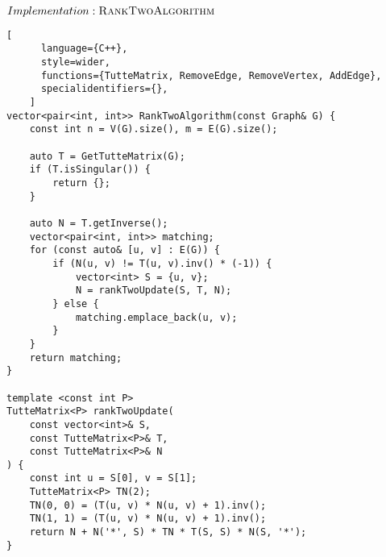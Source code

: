 \begin{programruledcaption}{\(Implementation: \textsc{RankTwoAlgorithm}\)}
    \begin{lstlisting}[
      language={C++},
      style=wider,
      functions={TutteMatrix, RemoveEdge, RemoveVertex, AddEdge},
      specialidentifiers={},
    ]
vector<pair<int, int>> RankTwoAlgorithm(const Graph& G) {
    const int n = V(G).size(), m = E(G).size();

    auto T = GetTutteMatrix(G);
    if (T.isSingular()) {
        return {};
    } 

    auto N = T.getInverse();
    vector<pair<int, int>> matching;
    for (const auto& [u, v] : E(G)) {
        if (N(u, v) != T(u, v).inv() * (-1)) {
            vector<int> S = {u, v};
            N = rankTwoUpdate(S, T, N);
        } else {
            matching.emplace_back(u, v);
        }
    }
    return matching;
}

template <const int P>
TutteMatrix<P> rankTwoUpdate(
    const vector<int>& S, 
    const TutteMatrix<P>& T,
    const TutteMatrix<P>& N
) {
    const int u = S[0], v = S[1];
    TutteMatrix<P> TN(2);
    TN(0, 0) = (T(u, v) * N(u, v) + 1).inv();
    TN(1, 1) = (T(u, v) * N(u, v) + 1).inv();
    return N + N('*', S) * TN * T(S, S) * N(S, '*');
}
    \end{lstlisting}
\end{programruledcaption}